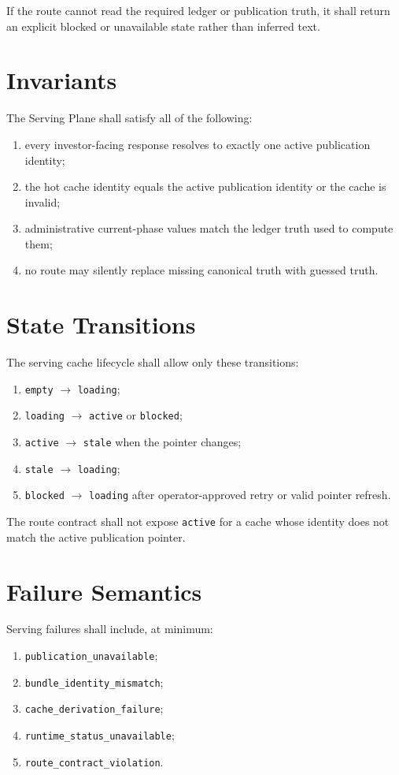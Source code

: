 \documentclass[11pt]{report}
\begin{document}
If the route cannot read the required ledger or publication truth, it shall return an explicit blocked or unavailable state rather than inferred text.

\section{Invariants}
The Serving Plane shall satisfy all of the following:
\begin{enumerate}[leftmargin=1.2cm]
    \item every investor-facing response resolves to exactly one active publication identity;
    \item the hot cache identity equals the active publication identity or the cache is invalid;
    \item administrative current-phase values match the ledger truth used to compute them;
    \item no route may silently replace missing canonical truth with guessed truth.
\end{enumerate}

\section{State Transitions}
The serving cache lifecycle shall allow only these transitions:
\begin{enumerate}[leftmargin=1.2cm]
    \item \texttt{empty} \(\rightarrow\) \texttt{loading};
    \item \texttt{loading} \(\rightarrow\) \texttt{active} or \texttt{blocked};
    \item \texttt{active} \(\rightarrow\) \texttt{stale} when the pointer changes;
    \item \texttt{stale} \(\rightarrow\) \texttt{loading};
    \item \texttt{blocked} \(\rightarrow\) \texttt{loading} after operator-approved retry or valid pointer refresh.
\end{enumerate}

The route contract shall not expose \texttt{active} for a cache whose identity does not match the active publication pointer.

\section{Failure Semantics}
Serving failures shall include, at minimum:
\begin{enumerate}[leftmargin=1.2cm]
    \item \texttt{publication\_unavailable};
    \item \texttt{bundle\_identity\_mismatch};
    \item \texttt{cache\_derivation\_failure};
    \item \texttt{runtime\_status\_unavailable};
    \item \texttt{route\_contract\_violation}.
\end{enumerate}
\end{document}
